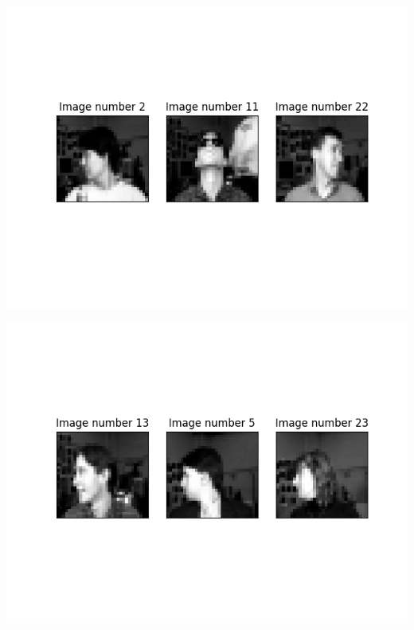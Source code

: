 \documentclass[a4paper]{article}
\begin{document}
\begin{itemize}
\begin{minipage}{0.4\textwidth}
  \includegraphics[scale=0.35]{plots/missclassified1.png}
  \label{plot_simple_nh2}
\end{minipage}
\hfill
\begin{minipage}{0.4\textwidth}
  \includegraphics[scale=0.35]{plots/missclassified2.png}
  \label{plot_simple_nh8}
\end{minipage}


\end{itemize}
\end{document}
